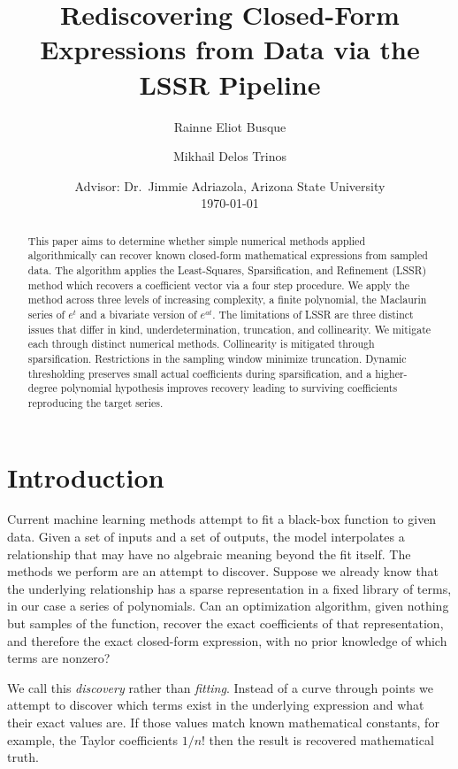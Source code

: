 \documentclass[11pt]{article}
\title{Rediscovering Closed-Form Expressions from Data via the LSSR Pipeline}
\author{Rainne Eliot Busque \and Mikhail Delos Trinos}
\date{\small Advisor: Dr.\ Jimmie Adriazola, Arizona State University\\[4pt] \today}
\begin{document}
\maketitle

\begin{abstract}
This paper aims to determine whether simple numerical methods applied algorithmically can recover known closed-form mathematical expressions from sampled data. The algorithm applies the Least-Squares, Sparsification, and Refinement (LSSR) method which recovers a coefficient vector via a four step procedure. We apply the method across three levels of increasing complexity, a finite polynomial, the Maclaurin series of $e^{t}$ and a bivariate version of $e^{at}$. The limitations of LSSR are three distinct issues that differ in kind, underdetermination, truncation, and collinearity. We mitigate each through distinct numerical methods. Collinearity is mitigated through sparsification. Restrictions in the sampling window minimize truncation. Dynamic thresholding preserves small actual coefficients during sparsification, and a higher-degree polynomial hypothesis improves recovery leading to surviving coefficients reproducing the target series. 
\end{abstract}

\section{Introduction}

Current machine learning methods attempt to fit a black-box function to given data\cite{brunton2016sindy}. Given a set of inputs and a set of outputs, the model interpolates a relationship that may have no algebraic meaning beyond the fit itself. The methods we perform are an attempt to discover. Suppose we already know that the underlying relationship has a sparse representation in a fixed library of terms, in our case a series of polynomials. Can an optimization algorithm, given nothing but samples of the function, recover the exact coefficients of that representation, and therefore the exact closed-form expression, with no prior knowledge of which terms are nonzero?

We call this \emph{discovery} rather than \emph{fitting}. Instead of a curve through points we attempt to discover which terms exist in the underlying expression
and what their exact values are. If those values match known mathematical constants, for example, the Taylor coefficients $1/n!$ then the result is recovered mathematical truth.
\end{document}
